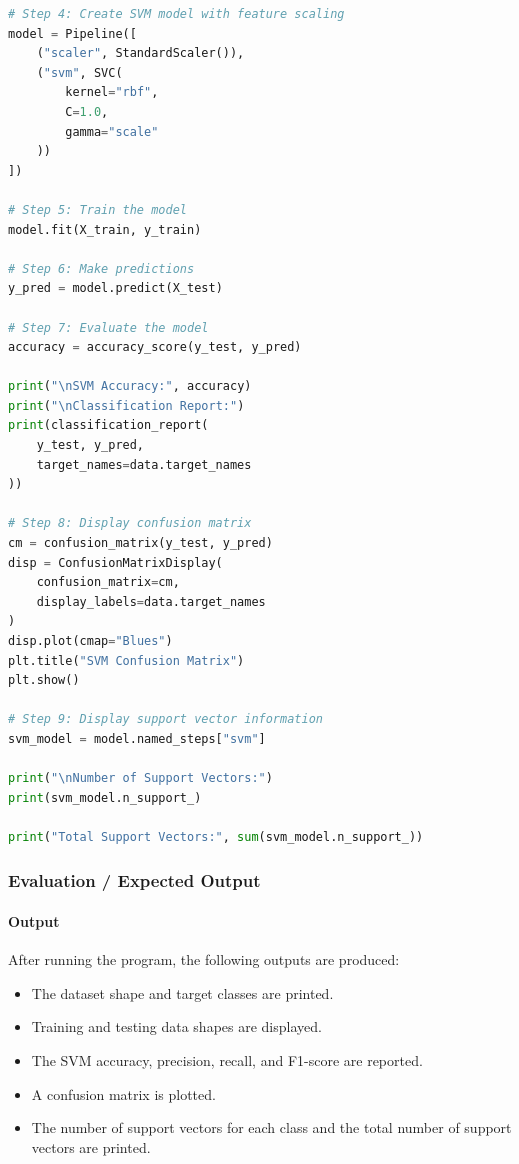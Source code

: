 \documentclass[a4paper,11pt]{article}
\begin{document}
\begin{itemize}
\begin{lstlisting}[language=Python, caption={SVM Implementation}]
# Step 4: Create SVM model with feature scaling
model = Pipeline([
    ("scaler", StandardScaler()),
    ("svm", SVC(
        kernel="rbf",
        C=1.0,
        gamma="scale"
    ))
])

# Step 5: Train the model
model.fit(X_train, y_train)

# Step 6: Make predictions
y_pred = model.predict(X_test)

# Step 7: Evaluate the model
accuracy = accuracy_score(y_test, y_pred)

print("\nSVM Accuracy:", accuracy)
print("\nClassification Report:")
print(classification_report(
    y_test, y_pred,
    target_names=data.target_names
))

# Step 8: Display confusion matrix
cm = confusion_matrix(y_test, y_pred)
disp = ConfusionMatrixDisplay(
    confusion_matrix=cm,
    display_labels=data.target_names
)
disp.plot(cmap="Blues")
plt.title("SVM Confusion Matrix")
plt.show()

# Step 9: Display support vector information
svm_model = model.named_steps["svm"]

print("\nNumber of Support Vectors:")
print(svm_model.n_support_)

print("Total Support Vectors:", sum(svm_model.n_support_))
\end{lstlisting}

\subsubsection{Evaluation / Expected Output}

\paragraph{Output}
After running the program, the following outputs are produced:
\begin{itemize}
    \item The dataset shape and target classes are printed.
    \item Training and testing data shapes are displayed.
    \item The SVM accuracy, precision, recall, and F1-score are reported.
    \item A confusion matrix is plotted.
    \item The number of support vectors for each class and the total number of support vectors are printed.
\end{itemize}


\end{itemize}
\end{document}

